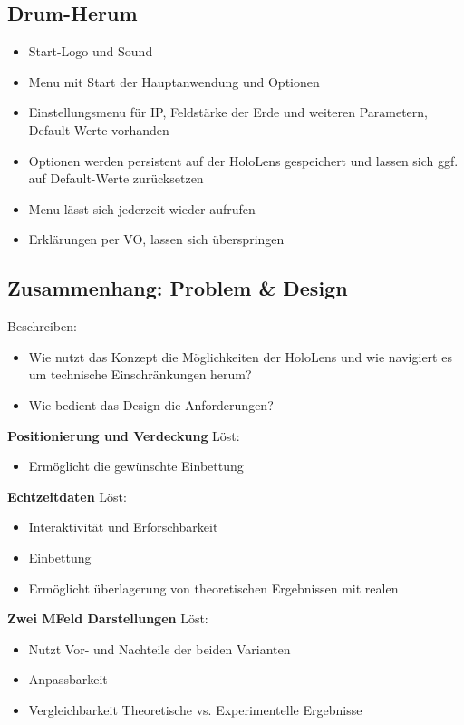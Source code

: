 \subsection{Drum-Herum}
\begin{itemize}[topsep=-2px]
	\setlength{\itemsep}{-5pt}
	\item Start-Logo und Sound
	\item Menu mit Start der Hauptanwendung und Optionen
	\item Einstellungsmenu für IP, Feldstärke der Erde und weiteren Parametern, Default-Werte vorhanden
	\item Optionen werden persistent auf der HoloLens gespeichert und lassen sich ggf. auf Default-Werte zurücksetzen
	\item Menu lässt sich jederzeit wieder aufrufen
	\item Erklärungen per VO, lassen sich überspringen
\end{itemize}

\subsection{Zusammenhang: Problem \& Design}
Beschreiben: 
\begin{itemize}
	\item Wie nutzt das Konzept die Möglichkeiten der HoloLens und wie navigiert es um technische Einschränkungen herum?
	\item Wie bedient das Design die Anforderungen?
\end{itemize}

\textbf{Positionierung und Verdeckung}
Löst:
\begin{itemize}
	\item Ermöglicht die gewünschte Einbettung
\end{itemize}

\textbf{Echtzeitdaten}
Löst:
\begin{itemize}
	\item Interaktivität und Erforschbarkeit
	\item Einbettung
	\item Ermöglicht überlagerung von theoretischen Ergebnissen mit realen
\end{itemize}

\textbf{Zwei MFeld Darstellungen}
Löst: 
\begin{itemize}
	\item Nutzt Vor- und Nachteile der beiden Varianten
	\item Anpassbarkeit
	\item Vergleichbarkeit Theoretische vs. Experimentelle Ergebnisse
\end{itemize}

